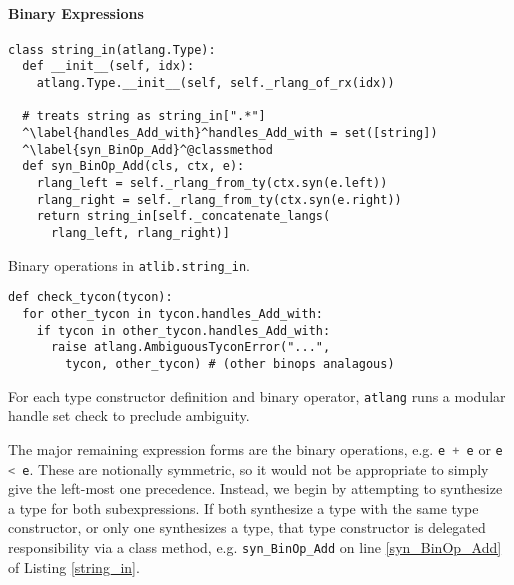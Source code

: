 \documentclass[9pt,preprint]{sigplanconf}
\newcommand{\lstinlinep}[1]{\lstinline[language=Python,basicstyle=\ttfamily\small]{#1}}
\begin{document}
\paragraph{Binary Expressions} \begin{codelisting}[t]
\begin{lstlisting}
class string_in(atlang.Type):
  def __init__(self, idx):
    atlang.Type.__init__(self, self._rlang_of_rx(idx))

  # treats string as string_in[".*"]
  ^\label{handles_Add_with}^handles_Add_with = set([string]) 
  ^\label{syn_BinOp_Add}^@classmethod
  def syn_BinOp_Add(cls, ctx, e): 
    rlang_left = self._rlang_from_ty(ctx.syn(e.left)) 
    rlang_right = self._rlang_from_ty(ctx.syn(e.right))
    return string_in[self._concatenate_langs(
      rlang_left, rlang_right)]
\end{lstlisting}
\caption{Binary operations in \texttt{atlib.string\_in}.}
\label{string_in}
\end{codelisting}
\begin{codelisting}[t]
\begin{lstlisting}
def check_tycon(tycon):
  for other_tycon in tycon.handles_Add_with: 
    if tycon in other_tycon.handles_Add_with:
      raise atlang.AmbiguousTyconError("...", 
        tycon, other_tycon) # (other binops analagous)
\end{lstlisting}
\caption{For each type constructor definition and binary operator, \texttt{atlang} runs a modular handle set check to preclude ambiguity.}
\label{check_tycon}
\end{codelisting}
The major remaining expression forms are the binary operations, e.g. \lstinlinep{e + e} or \lstinlinep{e < e}. These are notionally symmetric, so it would not be appropriate to simply give the left-most one precedence. Instead, we begin by attempting to synthesize a type for both subexpressions. If both synthesize a type with the same type constructor, or only one synthesizes a type, that type constructor is delegated responsibility via a class method, e.g. \lstinlinep{syn_BinOp_Add} on line \ref{syn_BinOp_Add} of Listing \ref{string_in}. 
\end{document}
